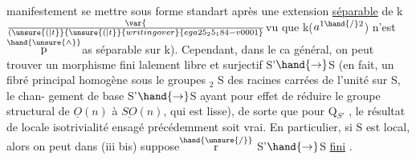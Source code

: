 
manifestement se mettre sous forme standart après une extension \uline{séparable}
de k $\var{\over{(}{\unsure{(|t}}}{\unsure{(|t}}{writing over}{ega25_25_184-v0001}$vu que k($a^{1\hand{/}2}$) n'est $\overset{\hand{\unsure{\wedge}}}{\mathrm{p}}$as séparable sur k). Cependant, dans le ca
 général, on peut trouver un morphisme fini  lalement
libre et surjectif S'$\hand{\to}$S (en fait, un fibré principal homogène sous
le  groupes \hand{$\mu$}$_{2}$ S  des racines carrées
 de l'unité sur S,\hand{--} le chan-%
gement de base S'$\hand{\to}$S ayant pour effet de réduire le groupe structural de
$\underline{O}(n)$ à $\underline{SO}(n)$, qui est lisse), de sorte que pour Q$_{S'}$ , le résultat de
locale isotrivialité ensagé précédemment soit vrai. En particulier, si
S est local, alors on peut dans (iii bis) suppose$\overset{\hand{\unsure{/}}}{\mathrm{r}}$ S'$\hand{\to}$S \uline{fini} .

